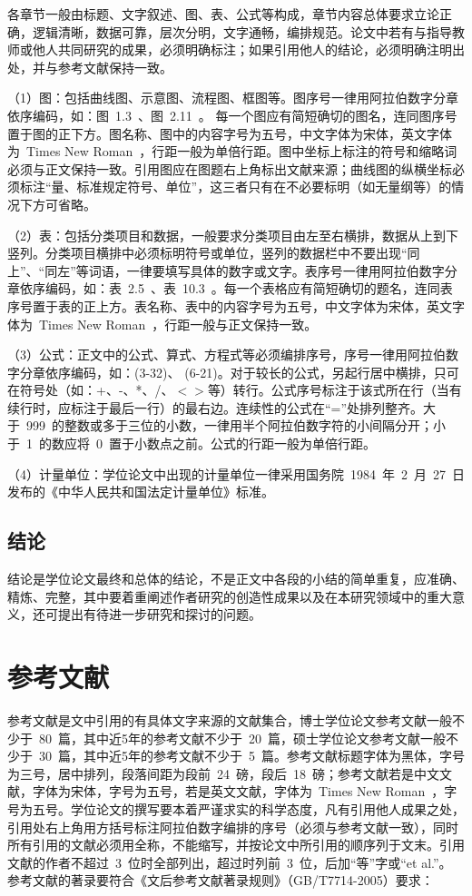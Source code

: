 各章节一般由标题、文字叙述、图、表、公式等构成，章节内容总体要求立论正确，逻辑清晰，数据可靠，层次分明，文字通畅，编排规范。论文中若有与指导教师或他人共同研究的成果，必须明确标注；如果引用他人的结论，必须明确注明出处，并与参考文献保持一致。

（1）图：包括曲线图、示意图、流程图、框图等。图序号一律用阿拉伯数字分章依序编码，如：图~1.3~、图~2.11~。 每一个图应有简短确切的图名，连同图序号置于图的正下方。图名称、图中的内容字号为五号，中文字体为宋体，英文字体为~Times New Roman~，行距一般为单倍行距。图中坐标上标注的符号和缩略词必须与正文保持一致。引用图应在图题右上角标出文献来源；曲线图的纵横坐标必须标注“量、标准规定符号、单位”，这三者只有在不必要标明（如无量纲等）的情况下方可省略。

（2）表：包括分类项目和数据，一般要求分类项目由左至右横排，数据从上到下竖列。分类项目横排中必须标明符号或单位，竖列的数据栏中不要出现“同上”、“同左”等词语，一律要填写具体的数字或文字。表序号一律用阿拉伯数字分章依序编码，如：表~2.5~、表~10.3~。每一个表格应有简短确切的题名，连同表序号置于表的正上方。表名称、表中的内容字号为五号，中文字体为宋体，英文字体为~Times New Roman~，行距一般与正文保持一致。

（3）公式：正文中的公式、算式、方程式等必须编排序号，序号一律用阿拉伯数字分章依序编码，如：(3-32)、 (6-21)。对于较长的公式，另起行居中横排，只可在符号处（如：+、-、*、/、$<$$>$等）转行。公式序号标注于该式所在行（当有续行时，应标注于最后一行）的最右边。连续性的公式在“=”处排列整齐。大于~999~的整数或多于三位的小数，一律用半个阿拉伯数字符的小间隔分开；小于~1~的数应将~0~置于小数点之前。公式的行距一般为单倍行距。

（4）计量单位：学位论文中出现的计量单位一律采用国务院~1984~年~2~月~27~日发布的《中华人民共和国法定计量单位》标准。

\subsection{结论}

结论是学位论文最终和总体的结论，不是正文中各段的小结的简单重复，应准确、精炼、完整，其中要着重阐述作者研究的创造性成果以及在本研究领域中的重大意义，还可提出有待进一步研究和探讨的问题。

\section{参考文献}

参考文献是文中引用的有具体文字来源的文献集合，博士学位论文参考文献一般不少于~80~篇，其中近5年的参考文献不少于~20~篇，硕士学位论文参考文献一般不少于~30~篇，其中近5年的参考文献不少于~5~篇。参考文献标题字体为黑体，字号为三号，居中排列，段落间距为段前~24~磅，段后~18~磅；参考文献若是中文文献，字体为宋体，字号为五号，若是英文文献，字体为~Times New Roman~，字号为五号。学位论文的撰写要本着严谨求实的科学态度，凡有引用他人成果之处，引用处右上角用方括号标注阿拉伯数字编排的序号（必须与参考文献一致），同时所有引用的文献必须用全称，不能缩写，并按论文中所引用的顺序列于文末。引用文献的作者不超过~3~位时全部列出，超过时列前~3~位，后加“等”字或“et al.”。 参考文献的著录要符合《文后参考文献著录规则》（GB/T7714-2005）要求：

